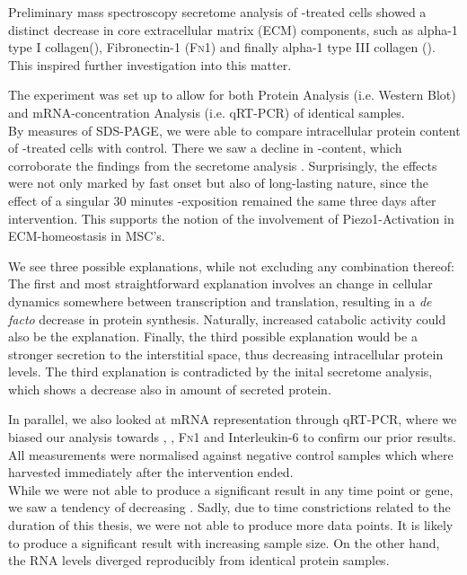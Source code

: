 Preliminary mass spectroscopy secretome analysis of \Yoda-treated cells showed a distinct decrease in core extracellular matrix (ECM) components, such as alpha-1 type I collagen(\colone), Fibronectin-1 (\textsc{Fn1}) and finally alpha-1 type III collagen (\colthree).
This inspired further investigation into this matter.\par

The experiment was set up to allow for both Protein Analysis (i.e. Western Blot) and mRNA-concentration Analysis (i.e. qRT-PCR) of identical samples.\\
By measures of SDS-PAGE, we were able to compare intracellular protein content of \Yoda-treated cells with control. There we saw a  decline in \colone-content, which corroborate the findings from the secretome analysis . Surprisingly, the effects were not only marked by fast onset but also of long-lasting nature, since the effect of a singular 30 minutes \Yoda-exposition remained the same three days after intervention. This supports the notion of the involvement of Piezo1-Activation in ECM-homeostasis in MSC's. \par

We see three possible explanations, while not excluding any combination thereof: The first and most straightforward explanation involves an change in cellular dynamics somewhere between transcription and translation, resulting in a \textit{de facto} decrease in protein synthesis. Naturally, increased catabolic activity could also be the explanation. Finally, the third possible explanation would be a stronger secretion to the interstitial space, thus decreasing intracellular protein levels. The third explanation is contradicted by the inital secretome analysis, which shows a decrease also in amount of secreted protein.

In parallel, we also looked at mRNA representation through qRT-PCR, where we biased our analysis towards \colone{ }, \colthree{ }, \textsc{Fn}1 
and Interleukin-6 to confirm our prior results.  All measurements were normalised against negative control samples which where harvested immediately after the intervention ended.\\
While we were not able to produce a significant result in any time point or gene, we saw a tendency of decreasing \colone. Sadly, due to time constrictions related to the duration of this thesis, we were not able to produce more data points. It is likely to produce a significant result with increasing sample size. On the other hand, the RNA levels diverged reproducibly from identical protein samples.


